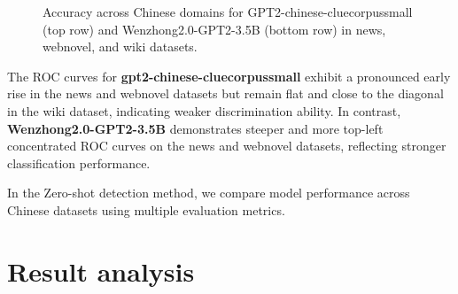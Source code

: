 \documentclass[lettersize,journal]{IEEEtran}
\begin{document}
\begin{figure}[h!]
    \caption{Accuracy across Chinese domains for GPT2-chinese-cluecorpussmall (top row) and Wenzhong2.0-GPT2-3.5B (bottom row) in news, webnovel, and wiki datasets.}
\end{figure}

The ROC curves for \textbf{gpt2-chinese-cluecorpussmall} exhibit a pronounced early rise in the news and webnovel datasets but remain flat and close to the diagonal in the wiki dataset, indicating weaker discrimination ability. In contrast, \textbf{Wenzhong2.0-GPT2-3.5B} demonstrates steeper and more top-left concentrated ROC curves on the news and webnovel datasets, reflecting stronger classification performance.

In the Zero-shot detection method, we compare model performance across Chinese datasets using multiple evaluation metrics.
\begin{table}[H]
 \centering
    \caption{gpt2-chinese-cluecorpussmall-Zh}
    \label{tab:my_label}
\setlength{\tabcolsep}{2pt}
\renewcommand{\arraystretch}{1.0}
\vspace{0.3cm}
\end{table}



\begin{table}[H]
 \centering
    \caption{Wenzhong2.0-GPT2-3.5B-chinese-Zh}
    \label{tab:my_label}
\setlength{\tabcolsep}{2pt}
\renewcommand{\arraystretch}{1.0}
\vspace{0.3cm}
\end{table}





\section{Result analysis}
\end{document}

